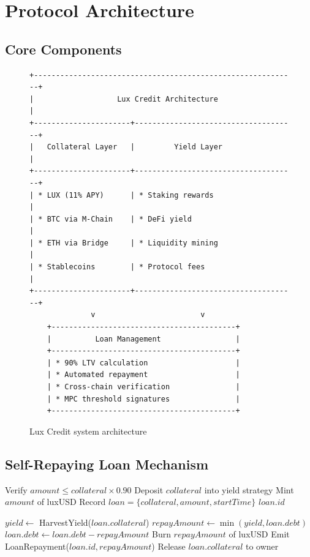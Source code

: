 \section{Protocol Architecture}


\subsection{Core Components}

\begin{figure}[h]
\centering
\begin{verbatim}
+------------------------------------------------------------+
|                   Lux Credit Architecture                   |
+----------------------+-------------------------------------+
|   Collateral Layer   |         Yield Layer                 |
+----------------------+-------------------------------------+
| * LUX (11% APY)      | * Staking rewards                   |
| * BTC via M-Chain    | * DeFi yield                        |
| * ETH via Bridge     | * Liquidity mining                  |
| * Stablecoins        | * Protocol fees                     |
+----------------------+-------------------------------------+
              v                        v
    +------------------------------------------+
    |          Loan Management                 |
    +------------------------------------------+
    | * 90% LTV calculation                    |
    | * Automated repayment                    |
    | * Cross-chain verification               |
    | * MPC threshold signatures               |
    +------------------------------------------+
\end{verbatim}
\caption{Lux Credit system architecture}
\end{figure}

\subsection{Self-Repaying Loan Mechanism}

\begin{algorithm}[H]
\caption{Lux Credit Loan Lifecycle}
\begin{algorithmic}[1]
    \State Verify $amount \leq collateral \times 0.90$ 
    \State Deposit $collateral$ into yield strategy
    \State Mint $amount$ of luxUSD
    \State Record $loan = \{collateral, amount, startTime\}$
    \State \Return $loan.id$
\EndFunction

        \State $yield \gets$ HarvestYield($loan.collateral$)
        \State $repayAmount \gets \min(yield, loan.debt)$
        \State $loan.debt \gets loan.debt - repayAmount$
        \State Burn $repayAmount$ of luxUSD
        \State Emit LoanRepayment($loan.id, repayAmount$)
    \EndWhile
    \State Release $loan.collateral$ to owner
\EndFunction
\end{algorithmic}
\end{algorithm}

